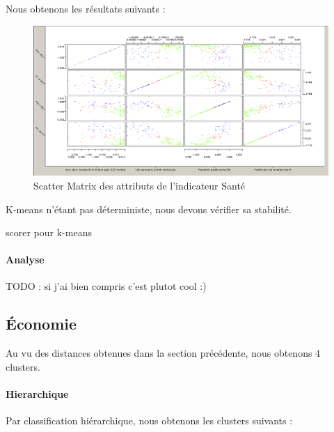 Nous obtenons les résultats suivants : 

\begin{figure}[H]
	\begin{center}
		\includegraphics[scale=0.5]{Image/ScatterMatrixSanteNoMissing2}
		\caption{Scatter Matrix des attributs de l'indicateur Santé \jeuc}
	\end{center}
\end{figure}

K-means n'étant pas déterministe, nous devons vérifier sa stabilité.

\begin{Huge} 
scorer pour k-means 
\end{Huge}

\paragraph{Analyse}
TODO : si j'ai bien compris c'est plutot cool :)

\subsection{Économie}
Au vu des distances obtenues dans la section précédente, nous obtenons 4 clusters.

\paragraph{Hierarchique} Par classification hiérarchique, nous obtenons les clusters suivants :

